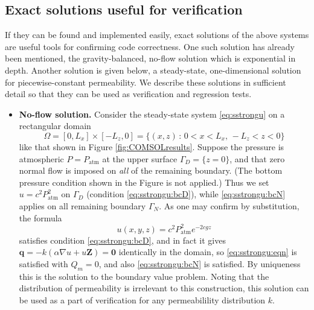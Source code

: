 \documentclass[11pt]{amsart}
\newcommand{\bq}{\mathbf{q}}
\newcommand{\bZ}{\mathbf{Z}}
\newcommand{\bzero}{\bm{0}}
\newcommand{\grad}{\nabla}
\newcommand{\Patm}{P_{\text{atm}}}
\begin{document}
\subsection{Exact solutions useful for verification}  If they can be found and implemented easily, exact solutions of the above systems are useful tools for confirming code correctness.  One such solution has already been mentioned, the gravity-balanced, no-flow solution which is exponential in depth.  Another solution is given below, a steady-state, one-dimensional solution for piecewise-constant permeability.  We describe these solutions in sufficient detail so that they can be used as verification and regression tests.

\begin{itemize}
\item \textbf{No-flow solution.}  Consider the steady-state system \eqref{eq:sstrongu} on a rectangular domain
\begin{equation}
\Omega = [0,L_x]\times [-L_z,0] = \{(x,z)\,:\,0<x<L_x, \,-L_z<z<0\}
\end{equation}
like that shown in Figure \ref{fig:COMSOLresults}.  Suppose the pressure is atmospheric $P=\Patm$ at the upper surface $\Gamma_D=\{z=0\}$, and that zero normal flow is imposed on \emph{all} of the remaining boundary.  (The bottom pressure condition shown in the Figure is not applied.)  Thus we set $u=c^2\Patm^2$ on $\Gamma_D$ (condition \eqref{eq:sstrongu:bcD}), while \eqref{eq:sstrongu:bcN} applies on all remaining boundary $\Gamma_N$.  As one may confirm by substitution, the formula
\begin{equation}
u(x,y,z) = c^2 \Patm^2 e^{-2cgz} \label{eq:noflow}
\end{equation}
satisfies condition \eqref{eq:sstrongu:bcD}, and in fact it gives $\bq = -k (\alpha\grad u + u \bZ) = \bzero$ identically in the domain, so \eqref{eq:sstrongu:eqn} is satisfied with $Q_m=0$, and also \eqref{eq:sstrongu:bcN} is satisfied.  By uniqueness this is the solution to the boundary value problem.  Noting that the distribution of permeability is irrelevant to this construction, this solution can be used as a part of verification for any permeabilility distribution $k$.


\end{itemize}
\end{document}
